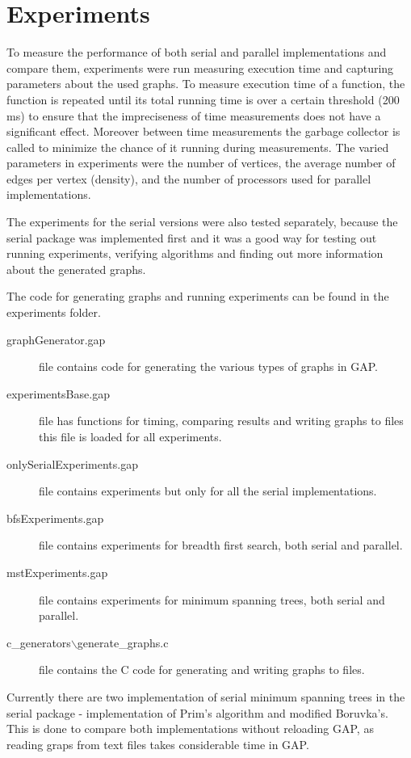 \documentclass{report}
\theoremstyle{plain}
\theoremstyle{definition}
\theoremstyle{remark}
\begin{document}
\section{Experiments}

To measure the performance of both serial and parallel implementations and compare them, experiments were run measuring execution time and capturing parameters about the used graphs. To measure execution time of a function, the function is repeated until its total running time is over a certain threshold (200 ms) to ensure that the impreciseness of time measurements does not have a significant effect. Moreover between time measurements the garbage collector is called to minimize the chance of it running during measurements. The varied parameters in experiments were the number of vertices, the average number of edges per vertex (density), and the number of processors used for parallel implementations.

The experiments for the serial versions were also tested separately, because the serial package was implemented first and it was a good way for testing out running experiments, verifying algorithms and finding out more information about the generated graphs.

The code for generating graphs and running experiments can be found in the experiments folder.
\begin{description}
\item[graphGenerator.gap] file contains code for generating the various types of graphs in GAP.
\item[experimentsBase.gap] file has functions for timing, comparing results and writing graphs to files this file is loaded for all experiments.
\item[onlySerialExperiments.gap] file contains experiments but only for all the serial implementations.
\item[bfsExperiments.gap] file contains experiments for breadth first search, both serial and parallel.
\item[mstExperiments.gap] file contains experiments for minimum spanning trees, both serial and parallel.
\item[c\_generators$\backslash$generate\_graphs.c] file contains the C code for generating and writing graphs to files.
\end{description}

Currently there are two implementation of serial minimum spanning trees in the serial package - implementation of Prim's algorithm and modified Boruvka's. This is done to compare both implementations without reloading GAP, as reading graps from text files takes considerable time in GAP.
\end{document}
